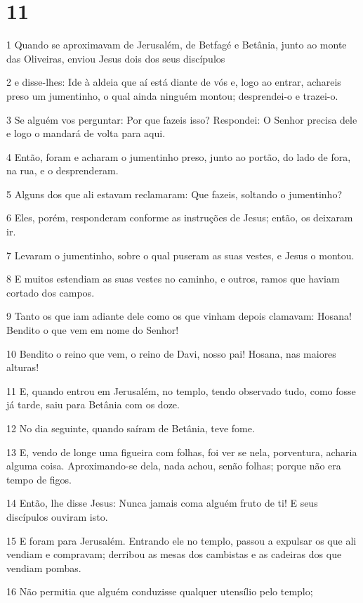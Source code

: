 \chapter{11}

\par 1 Quando se aproximavam de Jerusalém, de Betfagé e Betânia, junto ao monte das Oliveiras, enviou Jesus dois dos seus discípulos
\par 2 e disse-lhes: Ide à aldeia que aí está diante de vós e, logo ao entrar, achareis preso um jumentinho, o qual ainda ninguém montou; desprendei-o e trazei-o.
\par 3 Se alguém vos perguntar: Por que fazeis isso? Respondei: O Senhor precisa dele e logo o mandará de volta para aqui.
\par 4 Então, foram e acharam o jumentinho preso, junto ao portão, do lado de fora, na rua, e o desprenderam.
\par 5 Alguns dos que ali estavam reclamaram: Que fazeis, soltando o jumentinho?
\par 6 Eles, porém, responderam conforme as instruções de Jesus; então, os deixaram ir.
\par 7 Levaram o jumentinho, sobre o qual puseram as suas vestes, e Jesus o montou.
\par 8 E muitos estendiam as suas vestes no caminho, e outros, ramos que haviam cortado dos campos.
\par 9 Tanto os que iam adiante dele como os que vinham depois clamavam: Hosana! Bendito o que vem em nome do Senhor!
\par 10 Bendito o reino que vem, o reino de Davi, nosso pai! Hosana, nas maiores alturas!
\par 11 E, quando entrou em Jerusalém, no templo, tendo observado tudo, como fosse já tarde, saiu para Betânia com os doze.
\par 12 No dia seguinte, quando saíram de Betânia, teve fome.
\par 13 E, vendo de longe uma figueira com folhas, foi ver se nela, porventura, acharia alguma coisa. Aproximando-se dela, nada achou, senão folhas; porque não era tempo de figos.
\par 14 Então, lhe disse Jesus: Nunca jamais coma alguém fruto de ti! E seus discípulos ouviram isto.
\par 15 E foram para Jerusalém. Entrando ele no templo, passou a expulsar os que ali vendiam e compravam; derribou as mesas dos cambistas e as cadeiras dos que vendiam pombas.
\par 16 Não permitia que alguém conduzisse qualquer utensílio pelo templo;
